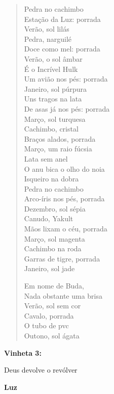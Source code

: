 \begin{verse}
Pedra no cachimbo\\
Estação da Luz: porrada\\
Verão, sol lilás\\[5pt]
Pedra, narguilé\\
Doce como mel: porrada\\
Verão, o sol âmbar\\[5pt]
É o Incrível Hulk\\
Um avião nos pés: porrada\\
Janeiro, sol púrpura\\[5pt]
Uns tragos na lata\\
De asas já nos pés: porrada\\
Março, sol turquesa\\[5pt]
Cachimbo, cristal\\
Braços alados, porrada\\
Março, um raio fúcsia\\[5pt]
Lata sem anel\\
O anu bica o olho do noia\\
Isqueiro na dobra\\[5pt]
Pedra no cachimbo\\
Arco-íris nos pés, porrada\\
Dezembro, sol sépia\\[5pt]
Canudo, Yakult\\
Mãos lixam o céu, porrada\\
Março, sol magenta\\[5pt]
Cachimbo na roda\\
Garras de tigre, porrada\\
Janeiro, sol jade\\[5pt]

\pagebreak

Em nome de Buda,\\
Nada obstante uma brisa\\
Verão, sol sem cor\\[5pt]
Cavalo, porrada\\
O tubo de pvc\\
Outono, sol ágata
\end{verse}

\pagebreak

\textbf{Vinheta 3:}

Deus devolve o revólver

\pagebreak

\textbf{Luz}

